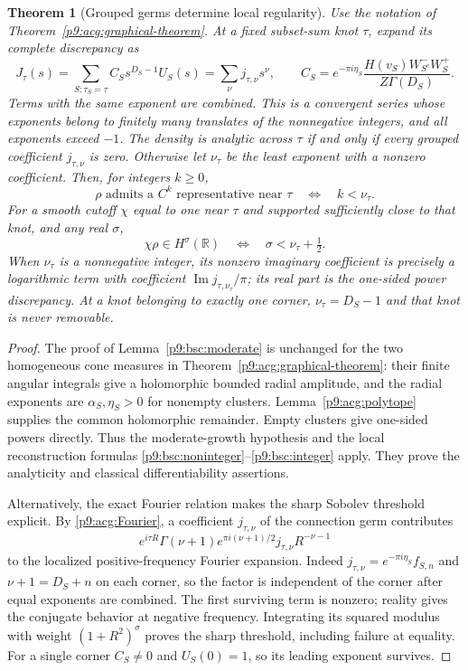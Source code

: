 \documentclass[11pt,a4paper]{article}
\newtheorem{theorem}{Theorem}[section]
\theoremstyle{definition}
\theoremstyle{remark}
\numberwithin{equation}{section}
\begin{document}
\begin{theorem}[Grouped germs determine local regularity]
\label{p9:gsr:criterion}
Use the notation of Theorem~\ref{p9:acg:graphical-theorem}. At a fixed
subset-sum knot $\tau$, expand its complete discrepancy as
\[
 J_\tau(s)=\sum_{S:\tau_S=\tau}C_Ss^{D_S-1}U_S(s)
          =\sum_{\nu}j_{\tau,\nu}s^\nu,
 \qquad C_S=e^{-\pi i\eta_S}\frac{H(v_S)W_{S^c}^-W_S^+}{Z\Gamma(D_S)}.
\]
Terms with the same exponent are combined. This is a convergent series
whose exponents belong to finitely many translates of the nonnegative
integers, and all exponents exceed $-1$.
The density is analytic across $\tau$ if and only if every grouped
coefficient $j_{\tau,\nu}$ is zero. Otherwise let $\nu_\tau$ be the
least exponent with a nonzero coefficient. Then, for integers $k\ge0$,
\[
 \rho\text{ admits a }C^k\text{ representative near }\tau
       \quad\Longleftrightarrow\quad k<\nu_\tau.
\]
For a smooth cutoff $\chi$ equal to one near $\tau$ and supported
sufficiently close to that knot, and any real $\sigma$,
\[
       \chi\rho\in H^\sigma(\mathbb R)
       \quad\Longleftrightarrow\quad
       \sigma<\nu_\tau+\tfrac12.
\]
When $\nu_\tau$ is a nonnegative integer, its nonzero imaginary
coefficient is precisely a logarithmic term with coefficient
$\operatorname{Im}j_{\tau,\nu_\tau}/\pi$; its real part is the
one-sided power discrepancy. At a knot belonging to exactly one
corner, $\nu_\tau=D_S-1$ and that knot is never removable.
\end{theorem}
\begin{proof}
The proof of Lemma~\ref{p9:bsc:moderate} is unchanged for the two
homogeneous cone measures in Theorem~\ref{p9:acg:graphical-theorem}:
their finite angular integrals give a holomorphic bounded radial
amplitude, and the radial exponents are $\alpha_S,\eta_S>0$ for
nonempty clusters. Lemma~\ref{p9:acg:polytope} supplies the common
holomorphic remainder. Empty clusters give one-sided powers directly.
Thus the moderate-growth hypothesis and the local reconstruction
formulas \eqref{p9:bsc:noninteger}--\eqref{p9:bsc:integer} apply.
They prove the analyticity and classical differentiability assertions.

Alternatively, the exact Fourier relation makes the sharp Sobolev
threshold explicit. By \eqref{p9:acg:Fourier}, a coefficient
$j_{\tau,\nu}$ of the connection germ contributes
\[
 e^{i\tau R}\Gamma(\nu+1)e^{\pi i(\nu+1)/2}
                    j_{\tau,\nu}R^{-\nu-1}
\]
to the localized positive-frequency Fourier expansion. Indeed
$j_{\tau,\nu}=e^{-\pi i\eta_S}f_{S,n}$ and
$\nu+1=D_S+n$ on each corner, so the factor is independent of
the corner after equal exponents are combined. The first surviving
term is nonzero; reality gives the conjugate behavior at negative
frequency. Integrating its squared modulus with weight
$(1+R^2)^\sigma$ proves the sharp threshold, including failure
at equality. For a single corner $C_S\ne0$ and $U_S(0)=1$,
so its leading exponent survives.
\end{proof}
\end{document}
